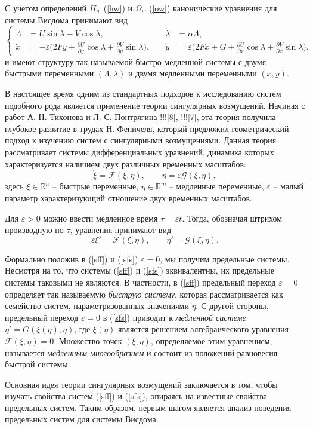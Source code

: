 С учетом определений $H_w$ (\ref{hw}) и $\Omega_w$ (\ref{ow}) канонические уравнения для системы Висдома принимают вид
\begin{equation}
    \left\{
    \begin{aligned}
        \dot{\Lambda} &= U \sin \lambda - V \cos \lambda,
        &\quad
        \dot{\lambda} &= \alpha \Lambda, \\[1.5ex]
        \dot{x} &= -\varepsilon \big( 2Fy + \frac{\partial U}{\partial y} \cos \lambda + \frac{\partial V}{\partial y} \sin \lambda \big),
        &\quad
        \dot{y} &= \varepsilon \big( 2Fx +  G + \frac{\partial U}{\partial x} \cos \lambda + \frac{\partial V}{\partial x} \sin \lambda \big).
    \end{aligned}
    \right.
    \label{fullt}
\end{equation}
и имеют структуру так называемой быстро-медленной системы с двумя быстрыми переменными $(\Lambda, \lambda)$ и двумя медленными переменными $(x, y)$.

В настоящее время одним из стандартных подходов к исследованию систем подобного рода является применение теории сингулярных возмущений. Начиная с работ А. Н. Тихонова и Л. С. Понтрягина !!![8], !!![7], эта теория получила глубокое развитие в трудах Н. Феничеля, который предложил геометрический подход к изучению систем с сингулярными возмущениями. Данная теория рассматривает системы дифференциальных уравнений, динамика которых характеризуется наличием двух различных временных масштабов:
\begin{equation}
\dot \xi = \mathcal{F}(\xi, \eta), \qquad \dot \eta = \varepsilon \mathcal{G}(\xi, \eta),
\label{sff}
\end{equation}
здесь $\xi \in \mathbb{R}^n$ -- быстрые переменные, $\eta \in \mathbb{R}^m$ -- медленные переменные, $\varepsilon$ -- малый параметр характеризующий отношение двух временных масштабов.

Для $\varepsilon > 0$ можно ввести медленное время $\tau = \varepsilon t$. Тогда, обозначая штрихом производную по $\tau$, уравнения принимают вид
\begin{equation}
\varepsilon \xi' = \mathcal{F}(\xi, \eta), \qquad \eta' = \mathcal{G}(\xi, \eta).
\label{sfs}
\end{equation}

Формально положив в (\ref{sff}) и (\ref{sfs}) $\varepsilon = 0$, мы получим предельные системы. Несмотря на то, что системы (\ref{sff}) и (\ref{sfs}) эквивалентны, их предельные системы таковыми не являются. В частности, в (\ref{sff}) предельный переход $\varepsilon = 0$ определяет так называемую \textit{быструю систему}, которая рассматривается как семейство систем, параметризованных значениями $\eta$. С другой стороны, предельный переход $\varepsilon = 0$ в (\ref{sfs}) приводит к \textit{медленной системе} $\eta' = G(\xi(\eta), \eta)$, где $\xi(\eta)$ является решением алгебраического уравнения $\mathcal{F}(\xi, \eta) = 0$. Множество точек $(\xi, \eta)$, определяемое этим уравнением, называется \textit{медленным многообразием} и состоит из положений равновесия быстрой системы.

Основная идея теории сингулярных возмущений заключается в том, чтобы изучать свойства систем (\ref{sff}) и (\ref{sfs}), опираясь на известные свойства предельных систем. Таким образом, первым шагом является анализ поведения предельных систем для системы Висдома.